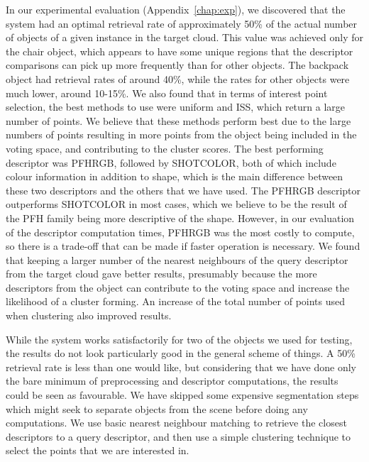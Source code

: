 \documentclass[11pt,a4paper]{kth-mag}
\begin{document}
In our experimental evaluation (Appendix~\ref{chap:exp}), we discovered that the
system had an optimal retrieval rate of approximately 50\% of the actual number
of objects of a given instance in the target cloud. This value was achieved only
for the chair object, which appears to have some unique regions that the
descriptor comparisons can pick up more frequently than for other objects. The
backpack object had retrieval rates of around 40\%, while the rates for other
objects were much lower, around 10-15\%. We also found that in terms of interest
point selection, the best methods to use were uniform and ISS, which return a
large number of points. We believe that these methods perform best due to the
large numbers of points resulting in more points from the object being included
in the voting space, and contributing to the cluster scores. The best performing
descriptor was PFHRGB, followed by SHOTCOLOR, both of which include colour
information in addition to shape, which is the main difference between these two
descriptors and the others that we have used. The PFHRGB descriptor outperforms
SHOTCOLOR in most cases, which we believe to be the result of the PFH family
being more descriptive of the shape. However, in our evaluation of the
descriptor computation times, PFHRGB was the most costly to compute, so there is
a trade-off that can be made if faster operation is necessary. We found that
keeping a larger number of the nearest neighbours of the query descriptor from
the target cloud gave better results, presumably because the more descriptors
from the object can contribute to the voting space and increase the likelihood
of a cluster forming. An increase of the total number of points used when
clustering also improved results.

While the system works satisfactorily for two of the objects we used for
testing, the results do not look particularly good in the general scheme of
things. A 50\% retrieval rate is less than one would like, but considering that
we have done only the bare minimum of preprocessing and descriptor computations,
the results could be seen as favourable. We have skipped some expensive
segmentation steps which might seek to separate objects from the scene before
doing any computations. We use basic nearest neighbour matching to retrieve the
closest descriptors to a query descriptor, and then use a simple clustering
technique to select the points that we are interested in.
\end{document}

